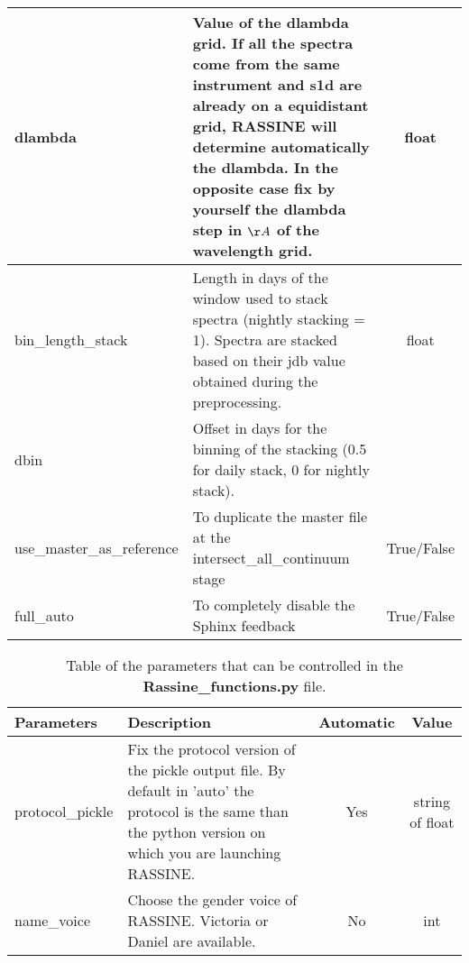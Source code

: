 \documentclass[10pt]{article}
\begin{document}
\begin{table}
\begin{tabular}{| l | p{80mm}| c |}
		dlambda  & Value of the dlambda grid. If all the spectra come from the same instrument and s1d are already on a equidistant grid, RASSINE will determine automatically the dlambda. In the opposite case fix by yourself the dlambda step in $\AA$ of the wavelength grid.  & float  \\ \hline 
		bin\_length\_stack  & Length in days of the window used to stack spectra (nightly stacking = 1). Spectra are stacked based on their jdb value obtained during the preprocessing. & float \\ \hline 		
		dbin  & Offset in days for the binning of the stacking (0.5 for daily stack, 0 for nightly stack). &  \\ \hline 		
		use\_master\_as\_reference & To duplicate the master file at the intersect\_all\_continuum stage & True/False \\ \hline 
		full\_auto & To completely disable the Sphinx feedback & True/False \\ \hline 
		
		
	\end{tabular}
\end{table}

\begin{table}
	\caption{Table of the parameters that can be controlled in the \textbf{Rassine\_functions.py} file.\newline}             %
	\label{table:2}      %
	\centering                          %
	\begin{tabular}{| l |  p{80mm} | c | c |}        %
		\hline                 %
		Parameters & Description & Automatic & Value \\    %
		\hline                        %
		protocol\_pickle & Fix the protocol version of the pickle output file. By default in 'auto' the protocol is the same than the python version on which you are launching RASSINE.  & Yes & string of float \\ \hline      %
		name\_voice & Choose the gender voice of RASSINE. Victoria or Daniel are available.  & No & int \\ \hline
	\end{tabular}
\end{table}
\end{document}
